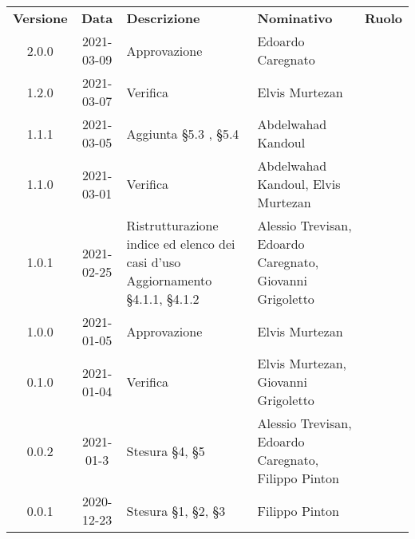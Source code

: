
{
\renewcommand{\arraystretch}{1.5}
\centering
\begin{longtable}{ c c  C{3.5cm}  C{4cm}  c }
    \rowcolor{\primaryColor}
    \textcolor{\secondaryColor}{
    \textbf{Versione}}     & \textcolor{\secondaryColor}{\textbf{Data}}       & \textcolor{\secondaryColor}
    {\textbf{Descrizione}} & \textcolor{\secondaryColor}{\textbf{Nominativo}} & \textcolor{\secondaryColor}{\textbf{Ruolo}}                                                                         \\


    2.0.0                  & 2021-03-09                                       & Approvazione                         & Edoardo Caregnato                                      & \responsabile{}    \\
    1.2.0                  & 2021-03-07                                       & Verifica                         & Elvis Murtezan                                      & \verificatore{}    \\
    1.1.1                  & 2021-03-05                                       & Aggiunta §5.3 , §5.4                       & Abdelwahad Kandoul                                     & \analista{}    \\
    1.1.0                  & 2021-03-01                                       & Verifica                         & Abdelwahad Kandoul, Elvis Murtezan                                      & \verificatore{}    \\
    1.0.1                  & 2021-02-25                                        & Ristrutturazione indice ed elenco dei casi d'uso \newline Aggiornamento §4.1.1, §4.1.2                              & Alessio Trevisan, Edoardo Caregnato, Giovanni Grigoletto & \analista{}    \\
    1.0.0                  & 2021-01-05                                       & Approvazione                                & Elvis Murtezan                                      & \responsabile{} \\
    0.1.0                  & 2021-01-04                                       & Verifica                                    & Elvis Murtezan, Giovanni Grigoletto                 & \verificatore{} \\
    0.0.2                  & 2021-01-3                                        & Stesura §4, §5                              & Alessio Trevisan, Edoardo Caregnato, Filippo Pinton & \analista{}    \\
    0.0.1                  & 2020-12-23                                       & Stesura §1, §2, §3                          & Filippo Pinton                                      & \analista{}    \\
\end{longtable}
}